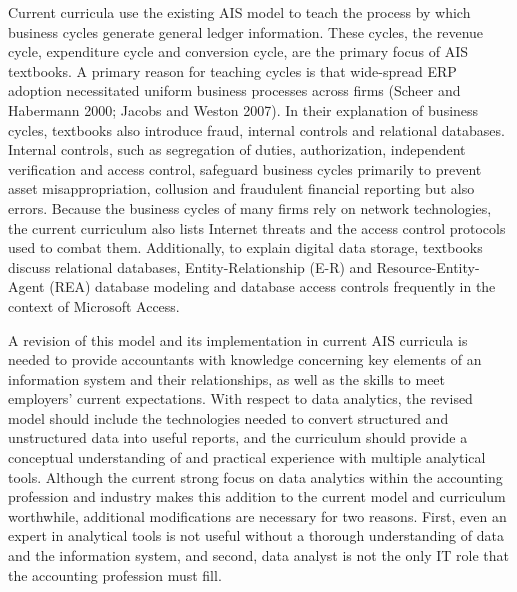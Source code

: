 \documentclass[12pt]{article}
\begin{document}
Current curricula use the existing AIS model to teach the process by which business cycles generate general ledger information. These cycles, the revenue cycle, expenditure cycle and conversion cycle, are the primary focus of AIS textbooks. A primary reason for teaching cycles is that wide-spread ERP adoption necessitated uniform business processes across firms (Scheer and Habermann 2000; Jacobs and Weston 2007). In their explanation of business cycles, textbooks also introduce fraud, internal controls and relational databases. Internal controls, such as segregation of duties, authorization, independent verification and access control, safeguard business cycles primarily to prevent asset misappropriation, collusion and fraudulent financial reporting but also errors. Because the business cycles of many firms rely on network technologies, the current curriculum also lists Internet threats and the access control protocols used to combat them. Additionally, to explain digital data storage, textbooks discuss relational databases, Entity-Relationship (E-R) and Resource-Entity-Agent (REA) database modeling and database access controls frequently in the context of Microsoft Access.

A revision of this model and its implementation in current AIS curricula is needed to provide accountants with knowledge concerning key elements of an information system and their relationships, as well as the skills to meet employers' current expectations. With respect to data analytics, the revised model should include the technologies needed to convert structured and unstructured data into useful reports, and the curriculum should provide a conceptual understanding of and practical experience with multiple analytical tools. Although the current strong focus on data analytics within the accounting profession and industry makes this addition to the current model and curriculum worthwhile, additional modifications are necessary for two reasons. First, even an expert in analytical tools is not useful without a thorough understanding of data and the information system, and second, data analyst is not the only IT role that the accounting profession must fill.
\end{document}
